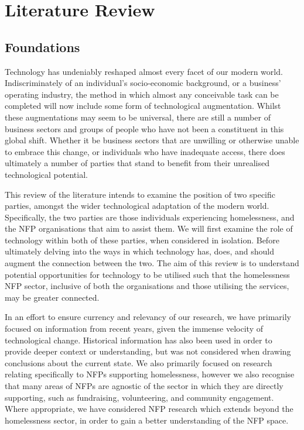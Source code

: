 \chapter{Literature Review}

\section{Foundations}

Technology has undeniably reshaped almost every facet of our modern world. Indiscriminately of an individual's socio-economic background, or a business' operating industry, the method in which almost any conceivable task can be completed will now include some form of technological augmentation. Whilst these augmentations may seem to be universal, there are still a number of business sectors and groups of people who have not been a constituent in this global shift. Whether it be business sectors that are unwilling or otherwise unable to embrace this change, or individuals who have inadequate access, there does ultimately a number of parties that stand to benefit from their unrealised technological potential.

This review of the literature intends to examine the position of two specific parties, amongst the wider technological adaptation of the modern world. Specifically, the two parties are those individuals experiencing homelessness, and the NFP organisations that aim to assist them. We will first examine the role of technology within both of these parties, when considered in isolation. Before ultimately delving into the ways in which technology has, does, and should augment the connection between the two. The aim of this review is to understand potential opportunities for technology to be utilised such that the homelessness NFP sector, inclusive of both the organisations and those utilising the services, may be greater connected.

In an effort to ensure currency and relevancy of our research, we have primarily focused on information from recent years, given the immense velocity of technological change. Historical information has also been used in order to provide deeper context or understanding, but was not considered when drawing conclusions about the current state. We also primarily focused on research relating specifically to NFPs supporting homelessness, however we also recognise that many areas of NFPs are agnostic of the sector in which they are directly supporting, such as fundraising, volunteering, and community engagement. Where appropriate, we have considered NFP research which extends beyond the homelessness sector, in order to gain a better understanding of the NFP space.

